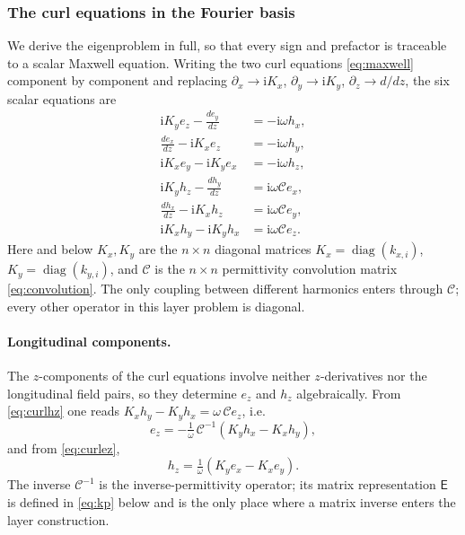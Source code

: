 \documentclass[11pt]{article}
\theoremstyle{remark}
\newcommand{\Cmat}{\mathcal{C}}
\newcommand{\epinv}{\mathsf{E}}
\DeclareMathOperator{\diag}{diag}
\newcommand{\ii}{\mathrm{i}}
\begin{document}
\subsubsection{The curl equations in the Fourier basis}

We derive the eigenproblem in full, so that every sign and prefactor is
traceable to a scalar Maxwell equation.  Writing the two curl equations
\eqref{eq:maxwell} component by component and replacing
$\partial_x\to\ii K_x$, $\partial_y\to\ii K_y$, $\partial_z\to d/dz$, the six
scalar equations are
\begin{align}
\ii K_y e_z-\frac{d e_y}{dz}&=-\ii\omega h_x, \label{eq:curlex}\\
\frac{d e_x}{dz}-\ii K_x e_z&=-\ii\omega h_y, \label{eq:curley}\\
\ii K_x e_y-\ii K_y e_x&=-\ii\omega h_z, \label{eq:curlez}\\
\ii K_y h_z-\frac{d h_y}{dz}&=\ii\omega\Cmat e_x, \label{eq:curlhx}\\
\frac{d h_x}{dz}-\ii K_x h_z&=\ii\omega\Cmat e_y, \label{eq:curlhy}\\
\ii K_x h_y-\ii K_y h_x&=\ii\omega\Cmat e_z. \label{eq:curlhz}
\end{align}
Here and below $K_x,K_y$ are the $n\times n$ diagonal matrices
$K_x=\diag(k_{x,i})$, $K_y=\diag(k_{y,i})$, and $\Cmat$ is the $n\times n$
permittivity convolution matrix \eqref{eq:convolution}.  The only coupling
between different harmonics enters through $\Cmat$; every other operator in
this layer problem is diagonal.

\paragraph{Longitudinal components.}
The $z$-components of the curl equations involve neither $z$-derivatives nor
the longitudinal field pairs, so they determine $e_z$ and $h_z$
algebraically.  From \eqref{eq:curlhz} one reads
$K_x h_y-K_y h_x=\omega\,\Cmat e_z$, i.e.\
\begin{equation}
e_z=-\tfrac{1}{\omega}\,\Cmat^{-1}(K_y h_x-K_x h_y),
\label{eq:longitudinal}
\end{equation}
and from \eqref{eq:curlez},
\begin{equation}
h_z=\tfrac{1}{\omega}(K_y e_x-K_x e_y).
\label{eq:longitudinal-hz}
\end{equation}
The inverse $\Cmat^{-1}$ is the inverse-permittivity operator; its matrix
representation $\epinv$ is defined in \eqref{eq:kp} below and is the only place
where a matrix inverse enters the layer construction.
\end{document}
